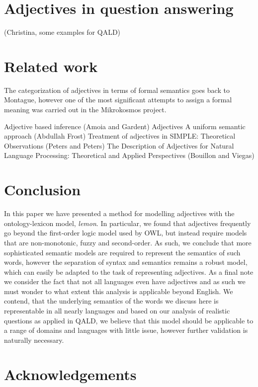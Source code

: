 \documentclass[11pt]{article}
\begin{document}
\section{Adjectives in question answering}

(Christina, some examples for QALD)

\section{Related work}

The categorization of adjectives in terms of formal semantics goes back to Montague, however one of the most significant attempts to assign a formal meaning was carried out in the Mikrokosmos project\cite{raskin1995lexical}. 


Adjective based inference (Amoia and Gardent)
Adjectives A uniform semantic approach (Abdullah Frost)
Treatment of adjectives in SIMPLE: Theoretical Observations (Peters and Peters)
The Description of Adjectives for Natural Language Processing: Theoretical and Applied Perspectives (Bouillon and Viegas)

\section{Conclusion}

In this paper we have presented a method for modelling adjectives with the
ontology-lexicon model, \emph{lemon}. In particular, we found that adjectives
frequently go beyond the first-order logic model used by OWL, but instead 
require models that are non-monotonic, fuzzy and second-order. As such, we 
conclude that more sophisticated semantic models are required to represent the semantics
of such words, however the separation of syntax and semantics remains a robust
model, which can easily be adapted to the task of representing adjectives. As 
a final note we consider the fact that not all languages even have adjectives
\cite{?} and as such we must wonder to what extent this analysis is applicable
beyond English. We contend, that the underlying semantics of the words we discuss here
is representable in all nearly languages and based on our analysis of realistic
questions as applied in QALD, we believe that this model should be applicable
to a range of domains and languages with little issue, however further 
validation is naturally necessary.

\section*{Acknowledgements}



\end{document}
